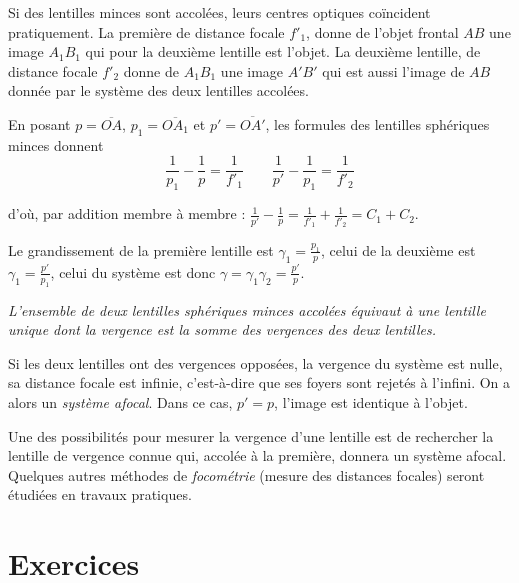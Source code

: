 Si des 	lentilles minces sont accolées, leurs centres optiques co\"incident 
pratiquement. La première de distance focale \(f'_1\), donne de l'objet frontal 
\(AB\) une image \(A_1B_1\) qui pour la deuxième lentille est l'objet. La 
deuxième lentille, de distance focale \(f'_2\) donne de \(A_1B_1\) une image 
\(A'B'\) qui est aussi l'image de \(AB\) donnée par le système des deux 
lentilles accolées.

En posant \(p = \overline{OA}\), \(p_1 = \overline{OA_1}\) et \(p' = 
\overline{OA'}\), les formules des lentilles sphériques minces donnent
\begin{equation}%
  \frac{1}{p_1} - \frac{1}{p} = \frac{1}{f'_1} \qquad \frac{1}{p'} - 
  \frac{1}{p_1} = \frac{1}{f'_2}
\end{equation}%

d'où, par addition membre à membre : \(\frac{1}{p'} - \frac{1}{p} = 
\frac{1}{f'_1} + \frac{1}{f'_2} = C_1 + C_2\).

Le grandissement de la première lentille est \(\gamma_1 = \frac{p_1}{p}\), 
celui de la deuxième est \(\gamma_1 = \frac{p'}{p_1}\), celui du système est 
donc \(\gamma = \gamma_1 \gamma_2 = \frac{p'}{p}\).

\emph{L'ensemble de deux lentilles sphériques minces accolées équivaut à une 
lentille unique dont la vergence est la somme des vergences des deux 
lentilles.}%

Si les deux lentilles ont des vergences opposées, la vergence du système est 
nulle, sa distance focale est infinie, c'est-à-dire que ses foyers sont rejetés 
à l'infini. On a alors un \emph{système afocal}. Dans ce cas, \(p' = p\), 
l'image est identique à l'objet.

Une des possibilités pour mesurer la vergence d'une lentille est de rechercher 
la lentille de vergence connue qui, accolée à la première, donnera un système 
afocal. Quelques autres méthodes de \emph{focométrie} (mesure des distances 
focales) seront étudiées en travaux pratiques.

\clearpage
\section{Exercices}%
\label{chap8-sec:exercices}%


